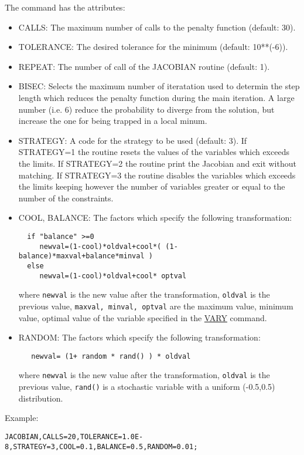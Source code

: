 The command has the attributes: 
\begin{itemize}
   \item CALLS: The maximum number of calls to the penalty function (default: 30). 
   \item TOLERANCE: The desired tolerance for the minimum (default: 10**(-6)). 
   \item REPEAT: The number of call of the JACOBIAN routine (default: 1). 
   \item BISEC: Selects the maximum number of iteratation used to
     determin the step length which reduces the penalty function during
     the main iteration. A large number (i.e. 6) reduce the probability
     to diverge from the solution, but increase the one for being
     trapped in a local minum.  
   \item STRATEGY: A code for the strategy to be used (default: 3). If
     STRATEGY=1 the routine resets the values of the variables which
     exceeds the limits. If STRATEGY=2 the routine print the Jacobian
     and exit without matching. If STRATEGY=3 the routine  disables the
     variables which exceeds the limits keeping however the number of
     variables greater or equal to the number of the constraints.  
   \item COOL, BALANCE: The factors which specify the following transformation:
\begin{verbatim}
  if "balance" >=0
     newval=(1-cool)*oldval+cool*( (1-balance)*maxval+balance*minval )
  else
     newval=(1-cool)*oldval+cool* optval
\end{verbatim}
      where \texttt{newval} is the new value after the transformation,
      \texttt{oldval} is the previous value, \texttt{maxval, minval,
        optval} are the maximum value, minimum value, optimal value of
      the variable specified in the \href{match_vary.html}{VARY}
      command.  
    \item RANDOM: The factors which specify the following transformation:
\begin{verbatim}
   newval= (1+ random * rand() ) * oldval
\end{verbatim}
      where \texttt{newval} is the new value after the transformation,
      \texttt{oldval} is the previous value, \texttt{rand()} is a stochastic
      variable with a uniform (-0.5,0.5) distribution.   
\end{itemize} 

Example: 
\begin{verbatim}
JACOBIAN,CALLS=20,TOLERANCE=1.0E-8,STRATEGY=3,COOL=0.1,BALANCE=0.5,RANDOM=0.01;
\end{verbatim}


